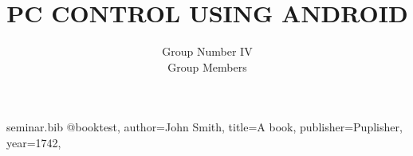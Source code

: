 \RequirePackage{filecontents}
\begin{filecontents*}{seminar.bib}
@book{test,
author={John Smith},
title={A book},
publisher={Puplisher},
year={1742},
}
\end{filecontents*}
\documentclass{beamer}
\usepackage{graphicx}

\usepackage{latexsym}		%
\usepackage{epsfig}		%
\usepackage{rotating}		%
\usepackage{eufrak}
\usepackage{natbib}
\def\newblock{\hskip .11em plus .33em minus .07em}





%
%


{
  \usetheme{Madrid}

  \setbeamercovered{transparent}
}


\usepackage[english]{babel}

\usepackage[latin1]{inputenc}

\usepackage{times}
\usepackage[T1]{fontenc}


\title[PC CONTROL USING ANDROID] %
{PC CONTROL USING ANDROID}
%

\author[Group Number IV\\Group Members] %
{Group Number IV\\Group Members}

